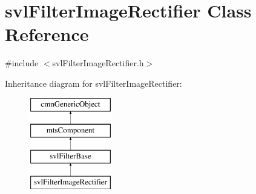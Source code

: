 \hypertarget{classsvl_filter_image_rectifier}{\section{svl\-Filter\-Image\-Rectifier Class Reference}
\label{classsvl_filter_image_rectifier}
}


{\ttfamily \#include $<$svl\-Filter\-Image\-Rectifier.\-h$>$}

Inheritance diagram for svl\-Filter\-Image\-Rectifier\-:\begin{figure}[H]
\begin{center}
\leavevmode
\includegraphics[height=4.000000cm]{d2/db6/classsvl_filter_image_rectifier}
\end{center}
\end{figure}
